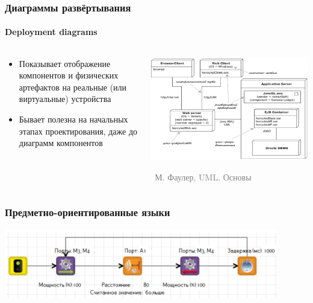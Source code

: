 \documentclass[xetex,mathserif,serif]{beamer}
\newcommand{\attribution}[1] {
\vspace{-5mm}\begin{flushright}\begin{scriptsize}\textcolor{gray}{\textcopyright\, #1}\end{scriptsize}\end{flushright}
}
\begin{document}
	\begin{frame}
		\frametitle{Диаграммы развёртывания}
		\framesubtitle{Deployment diagrams}
		\begin{columns}
			\begin{column}{0.5\textwidth}
				\begin{itemize}
					\item Показывает отображение компонентов и физических артефактов на реальные (или виртуальные) устройства
					\item Бывает полезна на начальных этапах проектирования, даже до диаграмм компонентов
				\end{itemize}
			\end{column}
			\begin{column}{0.5\textwidth}
				\begin{center}
					\includegraphics[width=\textwidth]{deploymentDiagram.png}
					\attribution{М. Фаулер, UML. Основы}
				\end{center}
			\end{column}
		\end{columns}
	\end{frame}

	\begin{frame}
		\frametitle{Предметно-ориентированные языки}
		\begin{center}
			\includegraphics[width=0.9\textwidth]{domainLanguages.png}
		\end{center}
	\end{frame}
\end{document}
